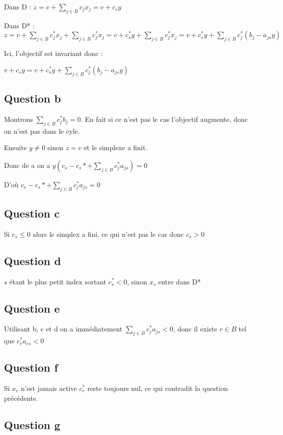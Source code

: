 \documentclass{article}
\begin{document}
Dans D : $z=v+\sum_{j\in \bar{B}}c_j x_j=v+c_s y$

Dans D* : $z=v+\sum_{j\in \bar{B}}c_j^* x_j+\sum_{j\in B}c_j^* x_j=v+c_s^* y+\sum_{j\in B}c_j^* x_j=v+c_s^* y+\sum_{j\in B}c_j^* (b_j-a_{js}y)$

Ici, l'objectif est invariant donc :

$v+c_s y=v+c_s^* y+\sum_{j\in B}c_j^* (b_j-a_{js}y)$

\subsection*{Question b}

Montrons $\sum_{j\in B}c_j^* b_j=0$. En fait si ce n'est pas le cas l'objectif augmente, donc on n'est pas dans le cyle.

Ensuite $y\neq 0$ sinon $z = v$ et le simplexe a finit.

Donc de a on a $y\left (c_s-c_s*+\sum_{j\in B}c_j^* a_{js}\right )=0$

D'où $c_s-c_s*+\sum_{j\in B}c_j^* a_{js}=0$


\subsection*{Question c}

Si $c_s\leq 0$ alors le simplex a fini, ce qui n'est pas le cas donc $c_s>0$

\subsection*{Question d}

$s$ étant le plus petit index sortant $c_s^*<0$, sinon $x_s$ entre dans D*

\subsection*{Question e} 

Utilisant b, c et d on a immédiatement $\sum_{j\in B}c_j^* a_{js}<0$, donc il existe $r \in B$ tel que $c_r^* a_{rs}<0$

\subsection*{Question f} 

Si $x_r$ n'est jamais active $c_r^*$ reste toujours nul, ce qui contradit la question précédente.

\subsection*{Question g} 
\end{document}
